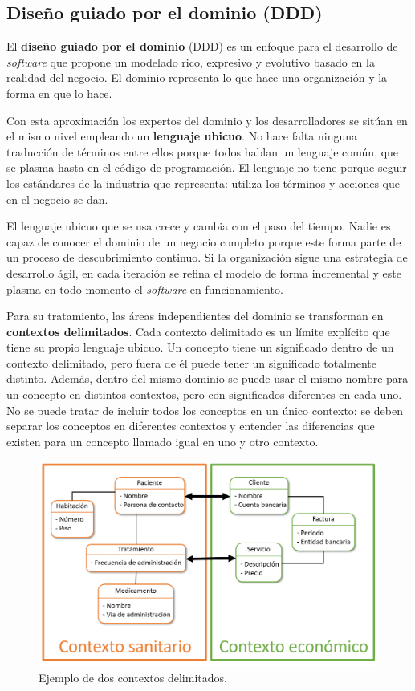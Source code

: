 \documentclass[11pt,spanish,listoffigures]{tfgetsinf}
\begin{document}
\subsection{Diseño guiado por el dominio (DDD)}

El \textbf{diseño guiado por el dominio} (DDD) \cite{Vaughn2013} es un enfoque para el desarrollo de \textit{software} que propone un modelado rico, expresivo y evolutivo basado en la realidad del negocio. El dominio representa lo que hace una organización y la forma en que lo hace.

Con esta aproximación los expertos del dominio y los desarrolladores se sitúan en el mismo nivel empleando un \textbf{lenguaje ubicuo}. No hace falta ninguna traducción de términos entre ellos porque todos hablan un lenguaje común, que se plasma hasta en el código de programación. El lenguaje no tiene porque seguir los estándares de la industria que representa: utiliza los términos y acciones que en el negocio se dan.

El lenguaje ubicuo que se usa crece y cambia con el paso del tiempo. Nadie es capaz de conocer el dominio de un negocio completo porque este forma parte de un proceso de descubrimiento continuo. Si la organización sigue una estrategia de desarrollo ágil, en cada iteración se refina el modelo de forma incremental y este plasma en todo momento el \textit{software} en funcionamiento.

Para su tratamiento, las áreas independientes del dominio se transforman en \textbf{contextos delimitados}. Cada contexto delimitado es un límite explícito que tiene su propio lenguaje ubicuo. Un concepto tiene un significado dentro de un contexto delimitado, pero fuera de él puede tener un significado totalmente distinto. Además, dentro del mismo dominio se puede usar el mismo nombre para un concepto en distintos contextos, pero con significados diferentes en cada uno. No se puede tratar de incluir todos los conceptos en un único contexto: se deben separar los conceptos en diferentes contextos y entender las diferencias que existen para un concepto llamado igual en uno y otro contexto.

\begin{figure}[h]
\centering
\includegraphics[scale=0.6]{BoundedContexts}
\caption{Ejemplo de dos contextos delimitados.}
\label{fig:BoundedContexts}
\end{figure}
\end{document}
